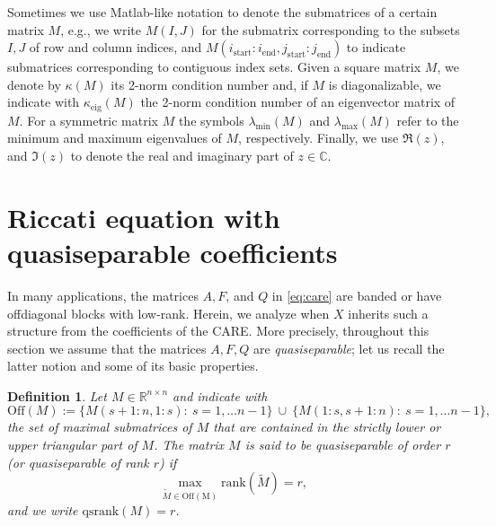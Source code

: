 \documentclass[a4paper,10pt]{article}
\def\rank{\mathrm{rank}}
\def\qsrank{\mathrm{qsrank}}
\newtheorem{definition}{Definition}[section]
\begin{document}
Sometimes we use Matlab-like notation to denote the submatrices of a certain matrix $M$, e.g., we write $M(I, J)$ for the submatrix corresponding to the subsets $I,J$ of row and column indices, and $M(i_{\mathrm{start}}:i_{\mathrm{end}},j_{\mathrm{start}}:j_{\mathrm{end}})$ to indicate submatrices corresponding to contiguous index sets.
Given a square matrix $M$, we denote by $\kappa(M)$ its 2-norm condition number and, if $M$ is diagonalizable, we indicate with $\kappa_{\mathrm{eig}}(M)$ the 2-norm condition number of an eigenvector matrix of $M$. For a symmetric matrix $M$ the symbols $\lambda_{\min}(M)$ and $\lambda_{\max}(M)$ refer to the minimum and maximum eigenvalues of $M$, respectively. Finally, we use $\Re(z)$, and $\Im(z)$ to denote the real and imaginary part of $z\in\mathbb C$.

\section{Riccati equation with quasiseparable coefficients}\label{sec:quasi-riccati}
In many applications, the matrices $A,F$, and $Q$ in \eqref{eq:care} are banded or have offdiagonal blocks with low-rank. Herein, we analyze when $X$ inherits such a structure from the coefficients of the CARE. More precisely, throughout this section we assume that the matrices $A,F,Q$ are \emph{quasiseparable}; let us recall the latter notion and some of its basic properties.
\begin{definition}
Let $M\in\mathbb R^{n\times n}$ and indicate with 
$$
\mathrm{Off}(M):=\{M(s+1:n,1:s):\ s=1,\dots n-1\}\ \cup\ \{M(1:s,s+1:n):\ s=1,\dots n-1\}, 
$$ 
the set of maximal submatrices of $M$ that are contained in the strictly lower or upper triangular  part of $M$. 
The matrix $M$ is said to be \emph{quasiseparable} of order $r$ (or quasiseparable of rank $r$) if $$\max_{\widetilde M\in\mathrm{Off(M)}}\rank(\widetilde M)=r,$$
and we write $\qsrank(M)=r$.
\end{definition} 
\end{document}
